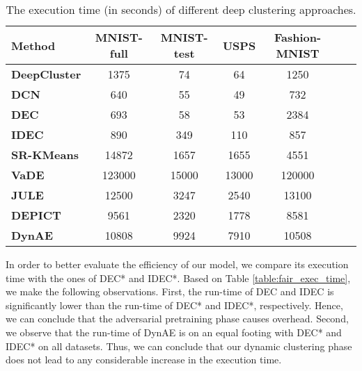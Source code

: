 \documentclass{article}
\begin{document}
\begin{table}[h!]
  \caption{The execution time (in seconds) of different deep clustering approaches.}
  \vskip 0.1in
  \begin{center}
  \begin{small}
  \begin{tabular}{|p{2.7cm}|c|c|c|c|c|c|}
    \hline
    {\textbf{Method}} & {\textbf{MNIST-full}} & {\textbf{MNIST-test}} & {\textbf{USPS}} &{\textbf{Fashion-MNIST}} \\ \hline
    \textbf{DeepCluster} & 1375 & 74 & 64 & 1250 \\ \hline
    \textbf{DCN} & 640 & 55 & 49 & 732 \\ \hline
    \textbf{DEC} & 693 & 58 & 53 & 2384 \\ \hline
    \textbf{IDEC} & 890 & 349 & 110 & 857 \\ \hline
    \textbf{SR-KMeans} & 14872 & 1657 & 1655 & 4551 \\ \hline
    \textbf{VaDE} & 123000 & 15000 & 13000 & 120000 \\ \hline
    \textbf{JULE} & 12500 & 3247 & 2540 & 13100 \\ \hline
    \textbf{DEPICT} & 9561 & 2320 & 1778 & 8581 \\ \hline
    \textbf{DynAE} & 10808 & 9924 & 7910 & 10508 \\ \hline 
  \end{tabular}
  \label{table:exec_time}
  \end{small}
  \end{center}
  \vskip 0.1in
\end{table}

In order to better evaluate the efficiency of our model, we compare its execution time with the ones of DEC* and IDEC*. Based on Table \ref{table:fair_exec_time}, we make the following observations. First, the run-time of DEC and IDEC is significantly lower than the run-time of DEC* and IDEC*, respectively. Hence, we can conclude that the adversarial pretraining phase causes overhead. Second, we observe that the run-time of DynAE is on an equal footing with DEC* and IDEC* on all datasets. Thus, we can conclude that our dynamic clustering phase does not lead to any considerable increase in the execution time.
\end{document}

